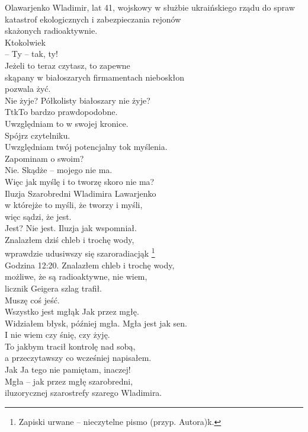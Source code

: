 \documentclass[../MAIN.tex]{subfiles}
\begin{document}
{O}{lawarjenko Wladimir, lat 41,
wojskowy w służbie ukraińskiego rządu do spraw\\
katastrof ekologicznych i zabezpieczania rejonów\\
skażonych radioaktywnie. \\
Ktokolwiek\\
-- Ty -- tak, ty!\\
Jeżeli to teraz czytasz, to zapewne\\
skąpany w białoszarych firmamentach nieboskłon\\
pozwala żyć.\\
Nie żyje? Półkolisty białoszary nie żyje?\\
Tt\3kTo bardzo prawdopodobne.\\
Uwzględniam to w swojej kronice.\\
Spójrz czytelniku.\\
Uwzględniam twój potencjalny tok myślenia.\\
Zapominam o swoim?\\
Nie. Skądże -- mojego nie ma.\\
Więc jak myślę i to tworzę skoro nie ma?\\
Iluzja Szarobredni Wladimira Lawarjenko\\
w którejże to myśli, że tworzy i myśli,\\
więc sądzi, że jest.\\
Jest? Nie jest. Iluzja jak wspomniał.\\
 Znalazłem dziś chleb i trochę wody,\\
 wprawdzie udusiwszy się szaroradiacją\3k
 \footnote{Zapiski urwane -- nieczytelne pismo (przyp. Autora)\3k.}\\
 Godzina 12:20. Znalazłem chleb i trochę wody,\\
 możliwe, że są radioaktywne, nie wiem,\\
 licznik Geigera szlag trafił.\\
 Muszę coś jeść.\\
 Wszystko jest mgłą\3k Jak przez mgłę.\\
 Widziałem błysk, później mgła. Mgła jest jak sen.\\
 I nie wiem czy śnię, czy żyję.\\
 To jakbym tracił kontrolę nad sobą,\\
 a przeczytawszy co wcześniej napisałem.\\
 Ja\3k Ja tego nie pamiętam, inaczej!\\
 Mgła -- jak przez mgłę szarobredni,\\
 iluzorycznej szarostrefy szarego Wladimira.}
\end{document}
